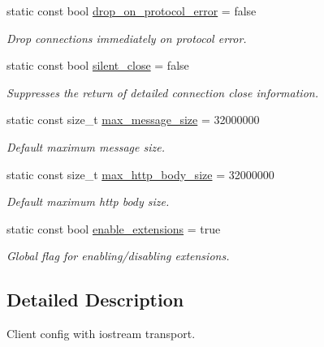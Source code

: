 \begin{DoxyCompactItemize}
\item 
static const bool \hyperlink{structwebsocketpp_1_1config_1_1core__client_aa43f6d2b983e0d8feb5e0bc1d9ad1be9}{drop\+\_\+on\+\_\+protocol\+\_\+error} = false
\begin{DoxyCompactList}\small\item\em Drop connections immediately on protocol error. \end{DoxyCompactList}\item 
static const bool \hyperlink{structwebsocketpp_1_1config_1_1core__client_affc0279e7717d68fbe5d2bb874f8d4d1}{silent\+\_\+close} = false
\begin{DoxyCompactList}\small\item\em Suppresses the return of detailed connection close information. \end{DoxyCompactList}\item 
static const size\+\_\+t \hyperlink{structwebsocketpp_1_1config_1_1core__client_a84c86d78867a89e10d24866deb931807}{max\+\_\+message\+\_\+size} = 32000000
\begin{DoxyCompactList}\small\item\em Default maximum message size. \end{DoxyCompactList}\item 
static const size\+\_\+t \hyperlink{structwebsocketpp_1_1config_1_1core__client_a4b68db9b245ec097555f7e99842d96b3}{max\+\_\+http\+\_\+body\+\_\+size} = 32000000
\begin{DoxyCompactList}\small\item\em Default maximum http body size. \end{DoxyCompactList}\item 
static const bool \hyperlink{structwebsocketpp_1_1config_1_1core__client_a21b1a53d292be873c1fffa7222cb3804}{enable\+\_\+extensions} = true\hypertarget{structwebsocketpp_1_1config_1_1core__client_a21b1a53d292be873c1fffa7222cb3804}{}\label{structwebsocketpp_1_1config_1_1core__client_a21b1a53d292be873c1fffa7222cb3804}

\begin{DoxyCompactList}\small\item\em Global flag for enabling/disabling extensions. \end{DoxyCompactList}\end{DoxyCompactItemize}


\subsection{Detailed Description}
Client config with iostream transport. 

